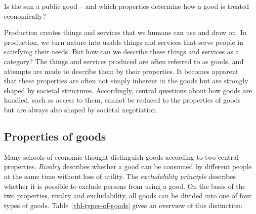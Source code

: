 \documentclass[
  british,
  a4paper,
  DIV=11,
  numbers=noendperiod,
  oneside,
  openany]{scrreprt}
\begin{document}
\begin{tcolorbox}[enhanced jigsaw, arc=.35mm, bottomrule=.15mm, bottomtitle=1mm, breakable, colback=white, colbacktitle=quarto-callout-note-color!10!white, colframe=quarto-callout-note-color-frame, coltitle=black, left=2mm, leftrule=.75mm, opacityback=0, opacitybacktitle=0.6, rightrule=.15mm, title={Guiding question}, titlerule=0mm, toprule=.15mm, toptitle=1mm]

Is the sun a public good -- and which properties determine how a good is
treated economically?

\end{tcolorbox}

Production creates things and services that we humans can use and draw
on. In production, we turn nature into usable things and services that
serve people in satisfying their needs. But how can we describe these
things and services as a category? The things and services produced are
often referred to as goods, and attempts are made to describe them by
their properties. It becomes apparent that these properties are often
not simply inherent in the goods but are strongly shaped by societal
structures. Accordingly, central questions about how goods are handled,
such as access to them, cannot be reduced to the properties of goods but
are always also shaped by societal negotiation.

\subsection{Properties of goods}\label{properties-of-goods}

Many schools of economic thought distinguish goods according to two
central properties. \emph{Rivalry} describes whether a good can be
consumed by different people at the same time without loss of utility.
The \emph{excludability principle} describes whether it is possible to
exclude persons from using a good. On the basis of the two properties,
rivalry and excludability, all goods can be divided into one of four
types of goods. Table~\ref{tbl-types-of-goods} gives an overview of this
distinction:
\end{document}
